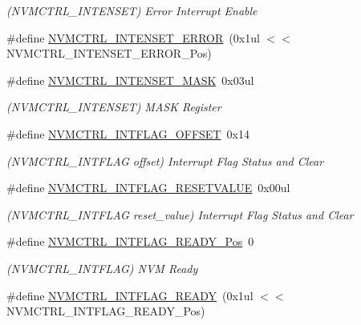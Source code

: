 \begin{DoxyCompactItemize}
\begin{DoxyCompactList}\small\item\em (N\+V\+M\+C\+T\+R\+L\+\_\+\+I\+N\+T\+E\+N\+S\+ET) Error Interrupt Enable \end{DoxyCompactList}\item 
\#define \mbox{\hyperlink{group___s_a_m_d21___n_v_m_c_t_r_l_ga0ed8ea82f01157010d7c740abd3b80a2}{N\+V\+M\+C\+T\+R\+L\+\_\+\+I\+N\+T\+E\+N\+S\+E\+T\+\_\+\+E\+R\+R\+OR}}~(0x1ul $<$$<$ N\+V\+M\+C\+T\+R\+L\+\_\+\+I\+N\+T\+E\+N\+S\+E\+T\+\_\+\+E\+R\+R\+O\+R\+\_\+\+Pos)
\item 
\#define \mbox{\hyperlink{group___s_a_m_d21___n_v_m_c_t_r_l_gac49294b6f689477f53cabe7aba8a4975}{N\+V\+M\+C\+T\+R\+L\+\_\+\+I\+N\+T\+E\+N\+S\+E\+T\+\_\+\+M\+A\+SK}}~0x03ul
\begin{DoxyCompactList}\small\item\em (N\+V\+M\+C\+T\+R\+L\+\_\+\+I\+N\+T\+E\+N\+S\+ET) M\+A\+SK Register \end{DoxyCompactList}\item 
\#define \mbox{\hyperlink{group___s_a_m_d21___n_v_m_c_t_r_l_ga28bff79f1cf058fa8a6c7072f5913862}{N\+V\+M\+C\+T\+R\+L\+\_\+\+I\+N\+T\+F\+L\+A\+G\+\_\+\+O\+F\+F\+S\+ET}}~0x14
\begin{DoxyCompactList}\small\item\em (N\+V\+M\+C\+T\+R\+L\+\_\+\+I\+N\+T\+F\+L\+AG offset) Interrupt Flag Status and Clear \end{DoxyCompactList}\item 
\#define \mbox{\hyperlink{group___s_a_m_d21___n_v_m_c_t_r_l_ga2d7e54384a5f6445cc9b9769ddf32ac2}{N\+V\+M\+C\+T\+R\+L\+\_\+\+I\+N\+T\+F\+L\+A\+G\+\_\+\+R\+E\+S\+E\+T\+V\+A\+L\+UE}}~0x00ul
\begin{DoxyCompactList}\small\item\em (N\+V\+M\+C\+T\+R\+L\+\_\+\+I\+N\+T\+F\+L\+AG reset\+\_\+value) Interrupt Flag Status and Clear \end{DoxyCompactList}\item 
\#define \mbox{\hyperlink{group___s_a_m_d21___n_v_m_c_t_r_l_gab04b4aece1f516c2e7ee00e7f29c9b69}{N\+V\+M\+C\+T\+R\+L\+\_\+\+I\+N\+T\+F\+L\+A\+G\+\_\+\+R\+E\+A\+D\+Y\+\_\+\+Pos}}~0
\begin{DoxyCompactList}\small\item\em (N\+V\+M\+C\+T\+R\+L\+\_\+\+I\+N\+T\+F\+L\+AG) N\+VM Ready \end{DoxyCompactList}\item 
\#define \mbox{\hyperlink{group___s_a_m_d21___n_v_m_c_t_r_l_ga3c427a204dab120e2aee8839fbe1cc7c}{N\+V\+M\+C\+T\+R\+L\+\_\+\+I\+N\+T\+F\+L\+A\+G\+\_\+\+R\+E\+A\+DY}}~(0x1ul $<$$<$ N\+V\+M\+C\+T\+R\+L\+\_\+\+I\+N\+T\+F\+L\+A\+G\+\_\+\+R\+E\+A\+D\+Y\+\_\+\+Pos)

\end{DoxyCompactItemize}
